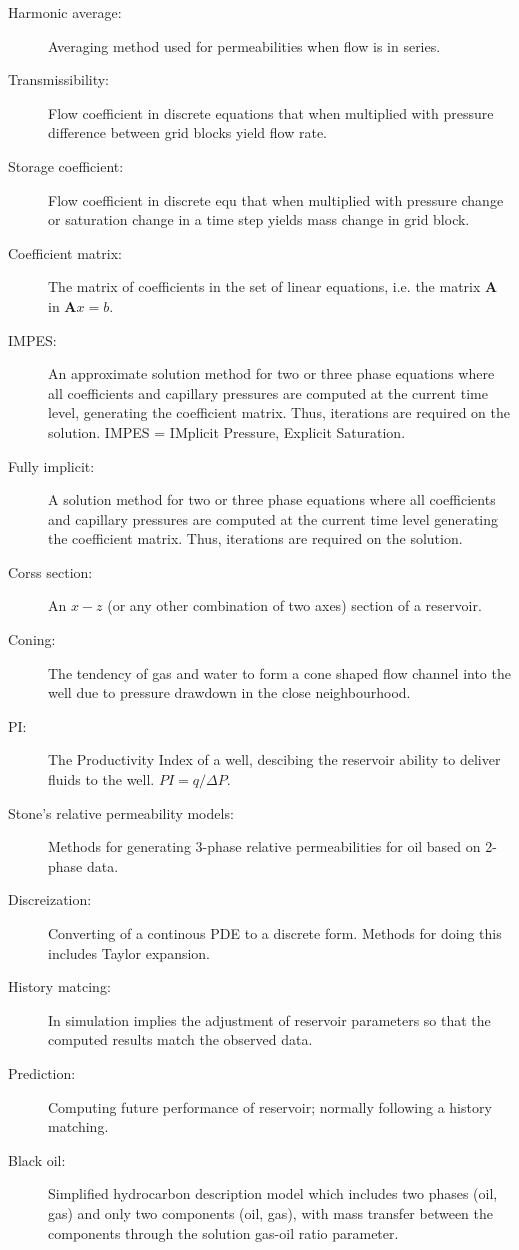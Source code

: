 \begin{description}
  \item[Harmonic average:] Averaging method used for permeabilities when flow is in series.
  \item[Transmissibility:] Flow coefficient in discrete equations that when multiplied with pressure difference between grid blocks yield flow rate.
  \item[Storage coefficient:] Flow coefficient in discrete equ that when multiplied with pressure change or saturation change in a time step yields mass change in grid block.
  \item[Coefficient matrix:] The matrix of coefficients in the set of linear equations, i.e. the matrix $\mathbf{A}$ in $\mathbf{A}x=b$.
  \item[IMPES:] An approximate solution method for two or three phase equations where all coefficients and capillary pressures are computed at the current time level, generating the coefficient matrix. Thus, iterations are required on the solution. IMPES = IMplicit Pressure, Explicit Saturation.
  \item[Fully implicit:] A solution method for two or three phase equations where all coefficients and capillary pressures are computed at the current time level generating the coefficient matrix. Thus, iterations are required on the solution.
  \item[Corss section:] An $x-z$ (or any other combination of two axes) section of a reservoir.
  \item[Coning:] The tendency of gas and water to form a cone shaped flow channel into the well due to pressure drawdown in the close neighbourhood.
  \item[PI:] The Productivity Index of a well, descibing the reservoir ability to deliver fluids to the well. $PI=q/\Delta P$.
  \item[Stone's relative permeability models:] Methods for generating 3-phase relative permeabilities for oil based on 2-phase data.
  \item[Discreization:] Converting of a continous PDE to a discrete form. Methods for doing this includes Taylor expansion.
  \item[History matcing:] In simulation implies the adjustment of reservoir parameters so that the computed results match the observed data.
  \item[Prediction:] Computing future performance of reservoir; normally following a history matching.
  \item[Black oil:] Simplified hydrocarbon description model which includes two phases (oil, gas) and only two components (oil, gas), with mass transfer between the components through the solution gas-oil ratio parameter.

\end{description}
